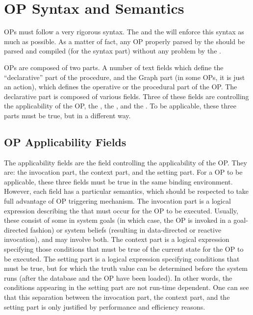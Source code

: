 \chapter{OP Syntax and Semantics}

OPs must follow a very rigorous syntax. The \OPE{} and the \CPK{} will
enforce this syntax as much as possible. As a matter of fact, any OP
properly parsed by the \OPE{} should be parsed and compiled (for the
syntax part) without any problem by the \CPK{}.

OPs are composed of two parts. A number of text fields which define the
``declarative'' part of the procedure, and the Graph part (in some OPs, it is
just an action), which defines the operative or the procedural part of the OP.
The declarative part is composed of various fields. Three of these fields are
controlling the applicability of the OP, the , the
, and the . To be applicable, these three
parts must be true, but in a different way.



\section{OP Applicability Fields}

The applicability fields are the field controlling the applicability of the OP.
They are: the invocation part, the context part, and the setting part. For a OP
to be applicable, these three fields must be true in the same binding
environment. However, each field has a particular semantics, which should be
respected to take full advantage of \COPRS{} OP triggering mechanism. The
invocation part is a logical expression describing the  that must
occur for the OP to be executed. Usually, these consist of some 
in system goals (in which case, the OP is invoked in a goal-directed fashion)
or system beliefs (resulting in data-directed or reactive invocation), and may
involve both. The context part is a logical expression specifying those
conditions that must be true of the current state for the OP to be executed.
The setting part is a logical expression specifying conditions that must be
true, but for which the truth value can be determined before the system runs
(after the database and the OP have been loaded). In other words, the conditions
appearing in the setting part are not run-time dependent. One can see that this
separation between the invocation part, the context part, and the setting part
is only justified by performance and efficiency reasons.



